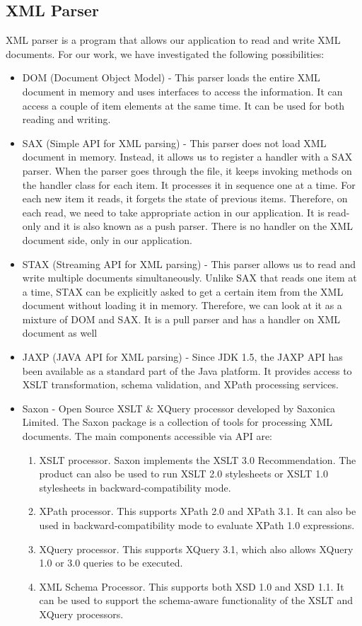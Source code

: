 \subsection{XML Parser}
XML parser is a program that allows our application to read and write XML documents. For our work, we have investigated the following possibilities:
\begin{itemize}
	\item DOM (Document Object Model) - This parser loads the entire XML document in memory and uses interfaces to access the information. It can access a couple of item elements at the same time. It can be used for both reading and writing.
	\item SAX (Simple API for XML parsing) - This parser does not load XML document in memory. Instead, it allows us to register a handler with a SAX parser. When the parser goes through the file, it keeps invoking methods on the handler class for each item. It processes it in sequence one at a time. For each new item it reads, it forgets the state of previous items. Therefore, on each read, we need to take appropriate action in our application. It is read-only and it is also known as a push parser. There is no handler on the XML document side, only in our application.
	\item STAX (Streaming API for XML parsing) - This parser allows us to read and write multiple documents simultaneously. Unlike SAX that reads one item at a time, STAX can be explicitly asked to get a certain item from the XML document without loading it in memory. Therefore, we can look at it as a mixture of DOM and SAX. It is a pull parser and has a handler on XML document as well
	\item JAXP (JAVA API for XML parsing) - Since JDK 1.5, the JAXP API has been available as a standard part of the Java platform. It provides access to XSLT transformation, schema validation, and XPath processing services.
	\item Saxon \cite{Saxon} - Open Source XSLT \& XQuery processor developed by Saxonica Limited. The Saxon package is a collection of tools for processing XML documents. The main components accessible via API are:
	\begin{enumerate}
		\item XSLT processor. Saxon implements the XSLT 3.0 Recommendation. The product can also be used to run XSLT 2.0 stylesheets or XSLT 1.0 stylesheets in backward-compatibility mode.
		\item XPath processor. This supports XPath 2.0 and XPath 3.1. It can also be used in backward-compatibility mode to evaluate XPath 1.0 expressions.
		\item XQuery processor. This supports XQuery 3.1, which also allows XQuery 1.0 or 3.0 queries to be executed. 
		\item XML Schema Processor. This supports both XSD 1.0 and XSD 1.1. It can be used to support the schema-aware functionality of the XSLT and XQuery processors.
	\end{enumerate}
\end{itemize}

